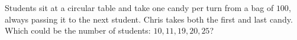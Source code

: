 Students sit at a circular table and take one candy per turn from a bag of $100$, always passing it to the next student. Chris takes both the first and last candy. Which could be the number of students: $10,11,19,20,25$?
